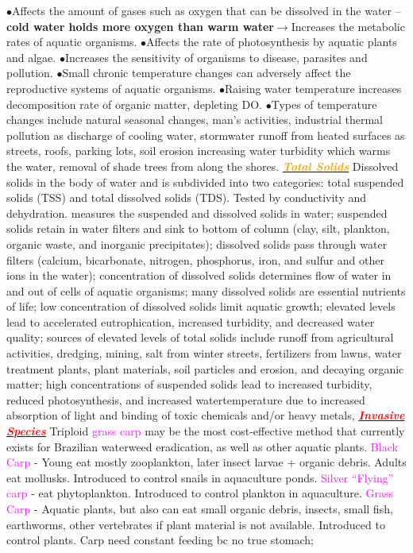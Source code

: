 \documentclass{article}
\newcommand{\ddd}{$\bullet$}
\newcommand{\red}[1]{\textcolor{red}{#1}}
\newcommand{\pink}[1]{\textcolor{magenta}{#1}}
\newcommand{\orange}[1]{\textcolor{orange}{#1}}
\newcommand{\mysection}[1]{\underline{{\textbf{\textit{\red{#1}}}}}}
\newcommand{\mysubsection}[1]{\underline{\textbf{{\textit{\orange{#1}}}}}}
\newcommand{\vocab}[1]{{\pink{#1}}}
\begin{document}
\begin{multicols*}{4}
             \ddd Affects the amount of gases such as oxygen that can be dissolved in the water – \textbf{cold water holds more oxygen than warm water}$ \rightarrow $Increases the metabolic rates of aquatic organisms. 
             \ddd Affects the rate of photosynthesis by aquatic plants and algae. 
             \ddd Increases the sensitivity of organisms to disease, parasites and pollution. 
             \ddd Small chronic temperature changes can adversely affect the reproductive systems of aquatic organisms. 
             \ddd Raising water temperature increases decomposition rate of organic matter, depleting DO. \ddd Types of temperature changes include natural seasonal changes, man’s activities, industrial thermal pollution as discharge of cooling water, stormwater runoff from heated surfaces as streets, roofs, parking lots, soil erosion increasing water turbidity which warms the water, removal of shade trees from along the shores.
        \mysubsection{Total Solids} 
        	Dissolved solids in the body of water and is subdivided into two categories: total suspended solids (TSS) and total dissolved solids (TDS). 	Tested by conductivity and dehydration. measures the suspended and dissolved solids in water; suspended solids retain in water filters and sink to bottom of column (clay,	silt, plankton, organic waste, and inorganic precipitates); dissolved solids pass through water filters (calcium, bicarbonate, nitrogen, phosphorus,	iron, and sulfur and other ions in the water); concentration of dissolved solids determines flow of water in and out of cells of aquatic organisms;    	many dissolved solids are essential nutrients of life; low concentration of dissolved solids limit aquatic growth; elevated levels lead to accelerated   	eutrophication, increased turbidity, and decreased water quality; sources of elevated levels of total solids include runoff from agricultural	activities, dredging, mining, salt from winter streets, fertilizers from lawns, water treatment plants, plant materials, soil particles and erosion, and	decaying organic matter; high concentrations of suspended solids lead to increased turbidity, reduced photosynthesis, and increased watertemperature due to increased absorption of light and binding of toxic chemicals and/or heavy metals,
   \mysection{Invasive Species}
  		Triploid \vocab{grass carp} may be the most cost-effective method that currently exists for Brazilian waterweed eradication, as well as other aquatic plants. \vocab{Black Carp} - Young eat mostly zooplankton, later insect larvae + organic debris. Adults eat mollusks. Introduced to control snails in aquaculture ponds. \vocab{Silver “Flying” carp} -  eat phytoplankton. Introduced to control plankton in aquaculture. \vocab{Grass Carp} - Aquatic plants, but also can eat small organic debris, insects, small fish, earthworms, other vertebrates if plant material is not available. Introduced to control plants. Carp need constant feeding bc no true stomach;

\end{multicols*}
\end{document}
